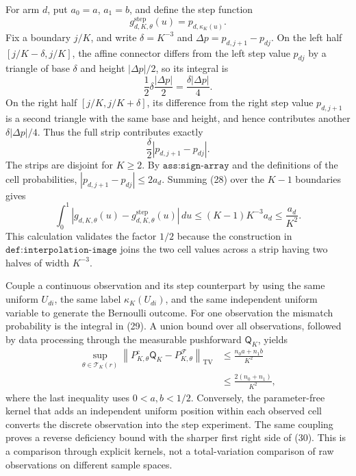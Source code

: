 For arm \(d\), put \(a_0=a\), \(a_1=b\), and define the step function
\[
 g^{\mathrm{step}}_{d,K,\theta}(u)
 =p_{d,\kappa_K(u)}.
\]
Fix a boundary \(j/K\), and write \(\delta=K^{-3}\) and
\(\Delta p=p_{d,j+1}-p_{dj}\).  On the left half
\([j/K-\delta,j/K]\), the affine connector differs from the left step
value \(p_{dj}\) by a triangle of base \(\delta\) and height
\(|\Delta p|/2\), so its integral is
\[
 \frac12\delta\frac{|\Delta p|}{2}
 =\frac{\delta|\Delta p|}{4}.
 \tag{27}
\]
On the right half \([j/K,j/K+\delta]\), its difference from the right
step value \(p_{d,j+1}\) is a second triangle with the same base and
height, and hence contributes another
\(\delta|\Delta p|/4\).  Thus the full strip contributes exactly
\[
 \frac{\delta}{2}|p_{d,j+1}-p_{dj}|.
 \tag{28}
\]
The strips are disjoint for \(K\ge2\).  By
\(\texttt{ass:sign-array}\) and the definitions of the cell
probabilities,
\(|p_{d,j+1}-p_{dj}|\le2a_d\).  Summing (28) over the
\(K-1\) boundaries gives
\[
 \int_0^1
 |g_{d,K,\theta}(u)-g^{\mathrm{step}}_{d,K,\theta}(u)|\,du
 \le (K-1)K^{-3}a_d
 \le\frac{a_d}{K^2}.
 \tag{29}
\]
This calculation validates the factor \(1/2\) because the construction
in \(\texttt{def:interpolation-image}\) joins the two cell values
across a strip having two halves of width \(K^{-3}\).

Couple a continuous observation and its step counterpart by using the
same uniform \(U_{di}\), the same label \(\kappa_K(U_{di})\), and the
same independent uniform variable to generate the Bernoulli outcome.
For one observation the mismatch probability is the integral in (29).
A union bound over all observations, followed by data processing
through the measurable pushforward \(\mathsf Q_K\), yields
\[
\begin{aligned}
 \sup_{\theta\in\mathcal T_K(r)}
 \left\lVert P^{\mathrm c}_{K,\theta}\mathsf Q_K
       -P^{\mathcal F}_{K,\theta}\right\rVert_{\mathrm{TV}}
 &\le\frac{n_0a+n_1b}{K^2}\\
 &\le\frac{2(n_0+n_1)}{K^2},
\end{aligned}
 \tag{30}
\]
where the last inequality uses \(0<a,b<1/2\).  Conversely, the
parameter-free kernel that adds an independent uniform position within
each observed cell converts the discrete observation into the step
experiment.  The same coupling proves a reverse deficiency bound with
the sharper first right side of (30).  This is a comparison through
explicit kernels, not a total-variation comparison of raw observations
on different sample spaces.

